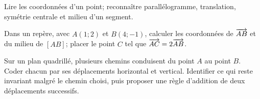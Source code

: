 \begin{prerequis}
Lire les coordonnées d'un point; reconnaître parallélogramme, translation,
symétrie centrale et milieu d'un segment.
\end{prerequis}
\begin{automatismes}
Dans un repère, avec $A(1;2)$ et $B(4;-1)$, calculer les coordonnées de
$\overrightarrow{AB}$ et du milieu de $[AB]$; placer le point $C$ tel que
$\overrightarrow{AC}=2\overrightarrow{AB}$.
\end{automatismes}
\begin{activite}
Sur un plan quadrillé, plusieurs chemins conduisent du point $A$ au point $B$.
Coder chacun par ses déplacements horizontal et vertical. Identifier ce qui
reste invariant malgré le chemin choisi, puis proposer une règle d'addition de
deux déplacements successifs.
\end{activite}

